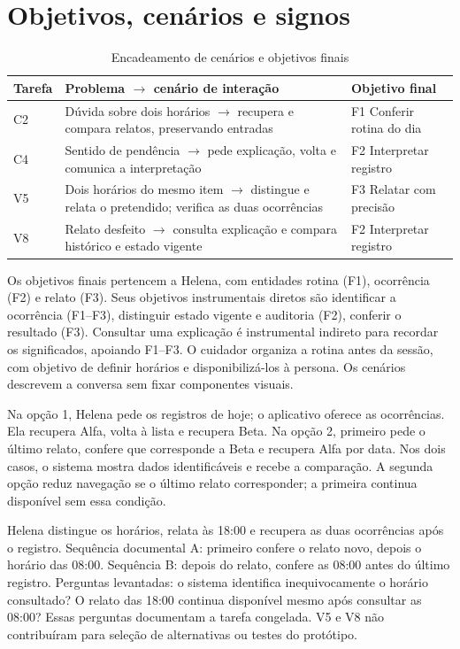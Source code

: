 \section{Objetivos, cenários e signos}
\begin{table}[ht]
\caption{Encadeamento de cenários e objetivos finais}\label{tab:mapa}
\small\begin{tabularx}{\columnwidth}{@{}lYY@{}}\toprule
Tarefa & Problema $\rightarrow$ cenário de interação & Objetivo final\\\midrule
C2 & Dúvida sobre dois horários $\rightarrow$ recupera e compara relatos, preservando entradas & F1 Conferir rotina do dia\\
C4 & Sentido de pendência $\rightarrow$ pede explicação, volta e comunica a interpretação & F2 Interpretar registro\\
V5 & Dois horários do mesmo item $\rightarrow$ distingue e relata o pretendido; verifica as duas ocorrências & F3 Relatar com precisão\\
V8 & Relato desfeito $\rightarrow$ consulta explicação e compara histórico e estado vigente & F2 Interpretar registro\\\bottomrule
\end{tabularx}
\end{table}

Os objetivos finais pertencem a Helena, com entidades rotina (F1), ocorrência (F2) e relato (F3). Seus objetivos instrumentais diretos são identificar a ocorrência (F1--F3), distinguir estado vigente e auditoria (F2), conferir o resultado (F3). Consultar uma explicação é instrumental indireto para recordar os significados, apoiando F1--F3. O cuidador organiza a rotina antes da sessão, com objetivo de definir horários e disponibilizá-los à persona. Os cenários descrevem a conversa sem fixar componentes visuais.

 Na opção 1, Helena pede os registros de hoje; o aplicativo oferece as ocorrências. Ela recupera Alfa, volta à lista e recupera Beta. Na opção 2, primeiro pede o último relato, confere que corresponde a Beta e recupera Alfa por data. Nos dois casos, o sistema mostra dados identificáveis e recebe a comparação. A segunda opção reduz navegação se o último relato corresponder; a primeira continua disponível sem essa condição.

 Helena distingue os horários, relata às 18:00 e recupera as duas ocorrências após o registro. Sequência documental A: primeiro confere o relato novo, depois o horário das 08:00. Sequência B: depois do relato, confere as 08:00 antes do último registro. Perguntas levantadas: o sistema identifica inequivocamente o horário consultado? O relato das 18:00 continua disponível mesmo após consultar as 08:00? Essas perguntas documentam a tarefa congelada. V5 e V8 não contribuíram para seleção de alternativas ou testes do protótipo.

